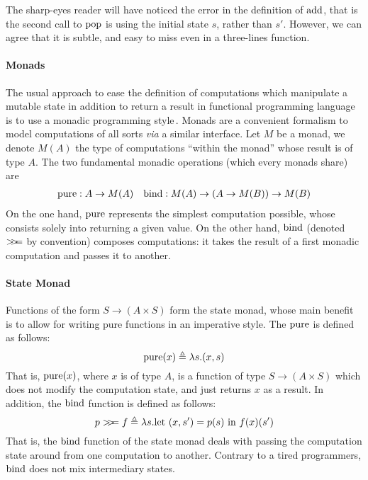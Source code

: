 The sharp-eyes reader will have noticed the error in the definition of
$\mathrm{add}$, that is the second call to $\mathrm{pop}$ is using the initial state
$s$, rather than $s'$.
%
However, we can agree that it is subtle, and easy to miss even in a three-lines
function.

\paragraph{Monads}
%
The usual approach to ease the definition of computations which manipulate a
mutable state in addition to return a result in functional programming language
is to use a monadic programming
style\,\cite{wadler1990comprehending,jones2005io}.
%
Monads are a convenient formalism to model computations of all sorts \emph{via}
a similar interface.
%
Let $M$ be a monad, we denote $M(A)$ the type of computations ``within the
monad'' whose result is of type $A$.
%
The two fundamental monadic operations (which every monads share) are
%
\begin{align*}
  \mathrm{pure} : A \rightarrow M(A)
  &
  & \mathrm{bind} : M(A) \rightarrow (A \rightarrow M(B)) \rightarrow M(B)
\end{align*}
%
On the one hand, $\mathrm{pure}$ represents the simplest computation possible,
whose consists solely into returning a given value.
%
On the other hand, $\mathrm{bind}$ (denoted $>\!\!>\!\!=$ by convention) composes
computations: it takes the result of a first monadic computation and passes it
to another.

\paragraph{State Monad}
%
Functions of the form $S \rightarrow (A \times S)$ form the state monad, whose
main benefit is to allow for writing pure functions in an imperative style.
%
The $\mathrm{pure}$ is defined as follows:
%
\[
  \mathrm{pure}(x) \triangleq \lambda s. (x, s)
\]
%
That is, $\mathrm{pure}(x)$, where $x$ is of type $A$, is a function of type
$S \rightarrow (A \times S)$ which does not modify the computation state, and
just returns $x$ as a result.
%
In addition, the $\mathrm{bind}$ function is defined as follows:
\[
  p >\!\!>\!\!= f \triangleq \lambda s. \text{let } (x, s') = p(s) \text{ in }
  f(x)(s')
\]
%
That is, the $\mathrm{bind}$ function of the state monad deals with passing the
computation state around from one computation to another.
%
Contrary to a tired programmers, $\mathrm{bind}$ does not mix intermediary states.

